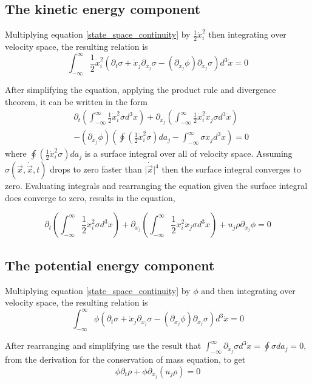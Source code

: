 \documentclass[%
 twocolumn,
 amsmath,amssymb,
 aps,
]{revtex4-1}
\newcommand{\dvec}[1]{\dot{\vec{#1}}}
\newcommand{\intVdot}[1]{\int_{-\infty}^{\infty} #1 d^3\dot{x}}
\begin{document}
\subsection{The kinetic energy component}
Multiplying equation \eqref{state_space_continuity} by $\frac{1}{2}\dot{x}_i^2$ then integrating over velocity space, the resulting relation is
\[
\intVdot{\frac{1}{2}\dot{x}_i^2\left(\partial_t \sigma + \dot{x}_j\partial_{x_j}\sigma-\left(\partial_{x_j}\phi\right)\partial_{\dot{x}_j}\sigma\right)}=0
\]

After simplifying the equation, applying the product rule and divergence theorem, it can be written in the form
\[
\begin{split}
& \partial_t\left(\intVdot{\frac{1}{2}\dot{x}_i^2\sigma}\right) + \partial_{x_j}\left(\intVdot{\frac{1}{2}\dot{x}_i^2\dot{x}_j\sigma}\right) \\ & -  \left(\partial_{x_j}\phi\right)\left(\oint\left(\frac{1}{2}\dot{x}_i^2\sigma\right)da_j - \intVdot{\sigma\dot{x}_j}\right)=0
\end{split}
\]
where $\oint\left(\frac{1}{2}\dot{x}_i^2\sigma\right)da_j$ is a surface integral over all of velocity space. Assuming $\sigma(\vec{x}, \dvec{x}, t)$ drops to zero faster than $\lvert\dvec{x}\rvert^4$ then the surface integral converges to zero. Evaluating integrals and rearranging the equation given the surface integral does converge to zero, results in the equation,

\begin{equation}
\partial_t\left(\intVdot{\frac{1}{2}\dot{x}_i^2\sigma}\right) + \partial_{x_j}\left(\intVdot{\frac{1}{2}\dot{x}_i^2\dot{x}_j\sigma}\right) + u_j\rho\partial_{x_j}\phi=0
\label{incomplete_conservation_of_energy_kinetic}
\end{equation}

\subsection{The potential energy component}
Multiplying equation \eqref{state_space_continuity} by $\phi$ and then integrating over velocity space, the resulting relation is
\[
\intVdot{\phi\left(\partial_t \sigma + \dot{x}_j\partial_{x_j}\sigma-\left(\partial_{x_j}\phi\right)\partial_{\dot{x}_j}\sigma\right)}=0
\]

After rearranging and simplifying use the result that $\intVdot{\partial_{\dot{x}_j}\sigma}=\oint\sigma da_j = 0$, from the derivation for the conservation of mass equation, to get
\[
\phi\partial_t\rho + \phi\partial_{x_j}\left(u_j\rho\right)=0
\]
\end{document}

